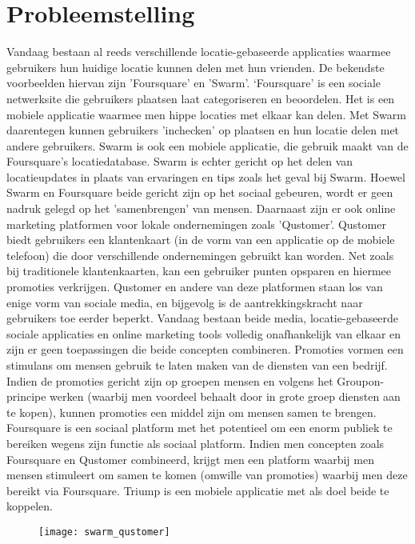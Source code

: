 \chapter{Probleemstelling}
Vandaag bestaan al reeds verschillende locatie-gebaseerde applicaties waarmee gebruikers hun huidige locatie kunnen delen met hun vrienden. De bekendste voorbeelden hiervan zijn 'Foursquare' en 'Swarm'. ‘Foursquare’ is een sociale netwerksite die gebruikers plaatsen laat categoriseren en beoordelen. Het is een mobiele applicatie waarmee men hippe locaties met elkaar kan delen. Met Swarm daarentegen kunnen gebruikers 'inchecken' op plaatsen en hun locatie delen met andere gebruikers. Swarm is ook een mobiele applicatie, die gebruik maakt van de Foursquare's locatiedatabase. Swarm is echter gericht op het delen van locatieupdates in plaats van ervaringen en tips zoals het geval bij Swarm.
Hoewel Swarm en Foursquare beide gericht zijn op het sociaal gebeuren, wordt er geen nadruk gelegd op het 'samenbrengen' van mensen. 
Daarnaast zijn er ook online marketing platformen voor lokale ondernemingen zoals 'Qustomer'. Qustomer biedt gebruikers een klantenkaart (in de vorm van een applicatie op de mobiele telefoon) die door verschillende ondernemingen gebruikt kan worden. Net zoals bij traditionele klantenkaarten, kan een gebruiker punten opsparen en hiermee promoties verkrijgen. Qustomer en andere van deze platformen staan los van enige vorm van sociale media, en bijgevolg is de aantrekkingskracht naar gebruikers toe eerder beperkt.
Vandaag bestaan beide media, locatie-gebaseerde sociale applicaties en online marketing tools volledig onafhankelijk van elkaar en zijn er geen toepassingen die beide concepten combineren. 
Promoties vormen een stimulans om mensen gebruik te laten maken van de diensten van een bedrijf. Indien de promoties gericht zijn op groepen mensen en volgens het Groupon-principe werken (waarbij men voordeel behaalt door in grote groep diensten aan te kopen), kunnen promoties een middel zijn om mensen samen te brengen.
Foursquare is een sociaal platform met het potentieel om een enorm publiek te bereiken wegens zijn functie als sociaal platform.
Indien men concepten zoals Foursquare en Qustomer combineerd, krijgt men een platform waarbij men mensen stimuleert om samen te komen (omwille van promoties) waarbij men deze bereikt via Foursquare.
Triump is een mobiele applicatie met als doel beide te koppelen. 
\begin{figure}[H]
	\centering
	\texttt{[image: swarm\_qustomer]}
	\label{fig:probleemstelling}
	
\end{figure}




